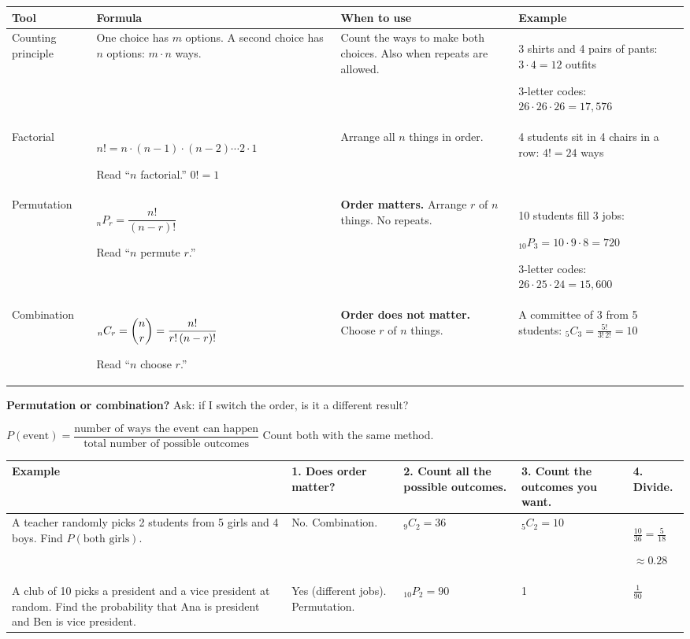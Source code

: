 \documentclass[11pt]{article}
\newcommand{\sumhead}[1]{\par\vspace{0.7em}{\large\bfseries #1}\par\vspace{0.3em}}
\begin{document}
\sumhead{Counting}
\begin{tabular}{|L{0.95in}|L{2.0in}|L{1.4in}|L{2.18in}|}\hline
\textbf{Tool} & \textbf{Formula} & \textbf{When to use} & \textbf{Example}\\ \hline
Counting principle & One choice has $m$ options. A second choice has $n$ options: $m \cdot n$ ways. & Count the ways to make both choices. Also when repeats are allowed. & 3 shirts and 4 pairs of pants: $3 \cdot 4 = 12$ outfits\par 3-letter codes: $26 \cdot 26 \cdot 26 = 17{,}576$\\ \hline
Factorial & $n! = n \cdot (n - 1) \cdot (n - 2) \cdots 2 \cdot 1$\par Read ``$n$ factorial.'' \; $0! = 1$ & Arrange all $n$ things in order. & 4 students sit in 4 chairs in a row: $4! = 24$ ways\\ \hline
Permutation & ${}_nP_r = \dfrac{n!}{(n - r)!}$\par Read ``$n$ permute $r$.'' & \textbf{Order matters.} Arrange $r$ of $n$ things. No repeats. & 10 students fill 3 jobs:\par ${}_{10}P_3 = 10 \cdot 9 \cdot 8 = 720$\par 3-letter codes: $26 \cdot 25 \cdot 24 = 15{,}600$\\ \hline
Combination & ${}_nC_r = \dbinom{n}{r} = \dfrac{n!}{r!\,(n - r)!}$\par Read ``$n$ choose $r$.'' & \textbf{Order does not matter.} Choose $r$ of $n$ things. & A committee of 3 from 5 students: ${}_5C_3 = \frac{5!}{3!\,2!} = 10$\\ \hline
\end{tabular}

\vspace{0.3em}
\textbf{Permutation or combination?} Ask: if I switch the order, is it a different result?

\sumhead{Probability with Counting}
$P(\text{event}) = \dfrac{\text{number of ways the event can happen}}{\text{total number of possible outcomes}}$ \qquad Count both with the same method.

\vspace{0.3em}
\begin{tabular}{|L{2.85in}|L{0.95in}|L{1.0in}|L{1.0in}|L{0.6in}|}\hline
\textbf{Example} & \textbf{1. Does order matter?} & \textbf{2. Count all the possible outcomes.} & \textbf{3. Count the outcomes you want.} & \textbf{4. Divide.}\\ \hline
A teacher randomly picks 2 students from 5 girls and 4 boys. Find $P(\text{both girls})$. & No. Combination. & ${}_9C_2 = 36$ & ${}_5C_2 = 10$ & $\frac{10}{36} = \frac{5}{18}$\par $\approx 0.28$\\ \hline
A club of 10 picks a president and a vice president at random. Find the probability that Ana is president and Ben is vice president. & Yes (different jobs). Permutation. & ${}_{10}P_2 = 90$ & 1 & $\frac{1}{90}$\\ \hline
\end{tabular}
\end{document}
